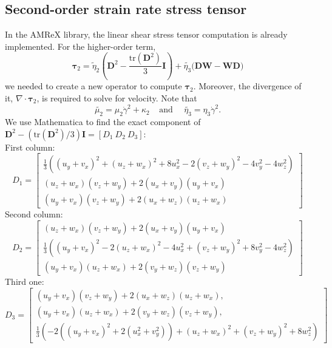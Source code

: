 \subsection{Second-order strain rate stress tensor}
In the AMReX library, the linear shear stress tensor computation is already implemented. For the higher-order term,
\[
  {\bm \tau}_{2} = 
  \tilde{\eta}_2
  \left( {\bm D}^2  - \frac{\text{tr}\left({\bm D}^2\right)}{3}{\bm I} \right)
  + \tilde{\eta_3} 
  \biggl( {\bm{DW}} - {\bm{WD}} \biggr)  
\]
we needed to create a new operator to compute $ {\bm \tau}_{2}$. Moreover, the divergence of it, $\nabla \cdot {\bm \tau}_{2}$, is required to solve for velocity. Note that 
\[
\tilde{\mu_2} =  \mu_2  \dot{\gamma}^2
+  \kappa_2 
\ \ \ \ \ \text{and} \ \ \ \ \ \
\tilde{\eta_3} =    \eta_3 \dot{\gamma}^2 .
\]
We use Mathematica to find the exact component of  ${\bm D}^2 - (\text{tr}({\bm D}^2)/3) {\bm I} = \left[ D_1  \ D_2 \ D_3 \right]$:
\\
First column:
\[
D_1 =
\begin{bmatrix}
   \frac{1}{3} \left(\left(u_y+v_x\right)^2+\left(u_z+w_x\right)^2+8 u_x^2-2 \left(v_z+w_y\right)^2-4 v_y^2-4 w_z^2\right)
   \\
   \left(u_z+w_x\right) \left(v_z+w_y\right)+2 \left(u_x+v_y\right) \left(u_y+v_x\right)
   \\
   \left(u_y+v_x\right) \left(v_z+w_y\right)+2 \left(u_x+w_z\right) \left(u_z+w_x\right)
\end{bmatrix}
\]
Second column:
\[
D_2 = 
\begin{bmatrix}
   \left(u_z+w_x\right) \left(v_z+w_y\right)+2 \left(u_x+v_y\right) \left(u_y+v_x\right)
   \\
   \frac{1}{3} \left(\left(u_y+v_x\right)^2-2 \left(u_z+w_x\right)^2-4 u_x^2+\left(v_z+w_y\right)^2+8 v_y^2-4 w_z^2\right)
   \\
   \left(u_y+v_x\right) \left(u_z+w_x\right)+2 \left(v_y+w_z\right) \left(v_z+w_y\right)
\end{bmatrix}
\]
Third one:
\[
D_3 = 
\begin{bmatrix}
   \left(u_y+v_x\right) \left(v_z+w_y\right)+2 \left(u_x+w_z\right) \left(u_z+w_x\right),
    \\
   \left(u_y+v_x\right) \left(u_z+w_x\right)+2 \left(v_y+w_z\right) \left(v_z+w_y\right),
   \\
   \frac{1}{3} \left(-2 \left(\left(u_y+v_x\right)^2+2 \left(u_x^2+v_y^2\right)\right)+\left(u_z+w_x\right)^2+\left(v_z+w_y\right)^2+8 w_z^2\right)
\end{bmatrix}
\]
